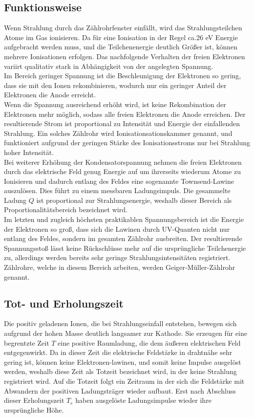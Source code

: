 \subsection{Funktionsweise}
Wenn Strahlung durch das Zählrohrfenster einfällt, wird das Strahlungsteilchen Atome im Gas ionisieren. Da für eine Ionisation in der Regel ca.26 eV Energie aufgebracht werden muss, und die Teilchenenergie deutlich Größer ist, können mehrere Ionisationen erfolgen. Das nachfolgende Verhalten der freien Elektronen variirt qualitativ stark in Abhängigkeit von der angelegten Spannung. \\
Im Bereich geringer Spannung ist die Beschleunigung der Elektronen so gering, dass sie mit den Ionen rekombinieren, wodurch nur ein geringer Anteil der Elektronen die Anode erreicht.\\ Wenn die Spannung ausreichend erhöht wird, ist keine Rekombination der Elektronen mehr möglich, sodass alle freien Elektronen die Anode erreichen. Der resultierende Strom ist proportional zu Intensität und Energie der einfallenden Strahlung. Ein solches Zählrohr wird Ionisationsationskammer genannt, und funktioniert aufgrund der geringen Stärke des Ionisationsstroms nur bei Strahlung hoher Intensität. \\
Bei weiterer Erhöhung der Kondensatorspannung nehmen die freien Elektronen durch das elektrische Feld genug Energie auf um ihrerseits wiederum Atome zu Ionisieren und dadurch entlang des Feldes eine sogenannte Townsend-Lawine auszulösen. Dies führt zu einem messbaren Ladungsimpuls. Die gesammelte Ladung $Q$ ist proportional zur Strahlungsenergie, weshalb dieser Bereich als Proportionalitätsbereich bezeichnet wird. \\ Im letzten und zugleich höchsten praktikablen Spannungsbereich ist die Energie der Elektronen so groß, dass sich die Lawinen durch UV-Quanten nicht nur entlang des Feldes, sondern im gesamten Zählrohr ausbreiten. Der resultierende Spannungsstoß lässt keine Rückschlüsse mehr auf die ursprüngliche Teilchenergie zu, allerdings werden bereits sehr geringe Strahlungsintensitäten registriert. Zählrohre, welche in diesem Bereich arbeiten, werden Geiger-Müller-Zählrohr genannt.
\subsection{Tot- und Erholungszeit}
Die positiv geladenen Ionen, die bei Strahlungseinfall entstehen, bewegen sich aufgrund der hohen Masse deutlich langsamer zur Kathode. Sie erzeugen für eine begrentzte Zeit $T$ eine positive Raumladung, die dem äußeren elektrischen Feld entgegenwirkt. Da in dieser Zeit die elektrische Feldstärke in drahtnähe sehr gering ist, können keine Elektronen-lawinen, und somit keine Impulse ausgelöst werden, weshalb diese Zeit als Totzeit bezeichnet wird, in der keine Strahlung registriert wird. Auf die Totzeit folgt ein Zeitraum in der sich die Feldstärke mit Abwandern der positiven Ladungsträger wieder aufbaut. Erst nach Abschluss dieser Erholungszeit $T_e$ haben ausgelöste Ladungsimpulse wieder ihre ursprüngliche Höhe.
